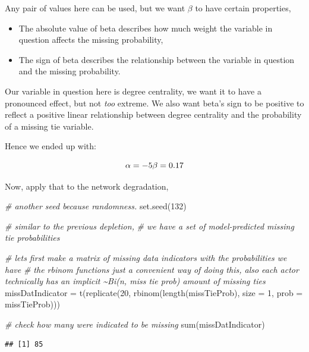 \documentclass[
]{article}
\newenvironment{Shaded}{\begin{snugshade}}{\end{snugshade}}
\newcommand{\AttributeTok}[1]{\textcolor[rgb]{0.77,0.63,0.00}{#1}}
\newcommand{\CommentTok}[1]{\textcolor[rgb]{0.56,0.35,0.01}{\textit{#1}}}
\newcommand{\DecValTok}[1]{\textcolor[rgb]{0.00,0.00,0.81}{#1}}
\newcommand{\FunctionTok}[1]{\textcolor[rgb]{0.00,0.00,0.00}{#1}}
\newcommand{\NormalTok}[1]{#1}
\newcommand{\OtherTok}[1]{\textcolor[rgb]{0.56,0.35,0.01}{#1}}
\providecommand{\tightlist}{%
  \setlength{\itemsep}{0pt}\setlength{\parskip}{0pt}}
\begin{document}
Any pair of values here can be used, but we want \(\beta\) to have
certain properties,

\begin{itemize}
\tightlist
\item
  The absolute value of beta describes how much weight the variable in
  question affects the missing probability,\\
\item
  The sign of beta describes the relationship between the variable in
  question and the missing probability.
\end{itemize}

Our variable in question here is degree centrality, we want it to have a
pronounced effect, but not \emph{too} extreme. We also want beta's sign
to be positive to reflect a positive linear relationship between degree
centrality and the probability of a missing tie variable.

Hence we ended up with:

\[\alpha = -5 \\ \beta = 0.17\]

Now, apply that to the network degradation,

\begin{Shaded}
\begin{Highlighting}[]
\CommentTok{\# another seed because randomness.}
\FunctionTok{set.seed}\NormalTok{(}\DecValTok{132}\NormalTok{)}

\CommentTok{\# similar to the previous depletion,}
\CommentTok{\# we have a set of model{-}predicted missing tie probabilities}

\CommentTok{\# let\textquotesingle{}s first make a matrix of missing data indicators with the probabilities we have}
\CommentTok{\# the rbinom function\textquotesingle{}s just a convenient way of doing this, also each actor technically has an implicit \textasciitilde{}Bi(n, miss tie prob) amount of missing ties}
\NormalTok{missDatIndicator }\OtherTok{=} \FunctionTok{t}\NormalTok{(}\FunctionTok{replicate}\NormalTok{(}\DecValTok{20}\NormalTok{, }\FunctionTok{rbinom}\NormalTok{(}\FunctionTok{length}\NormalTok{(missTieProb), }\AttributeTok{size =} \DecValTok{1}\NormalTok{, }\AttributeTok{prob =}\NormalTok{ missTieProb)))}

\CommentTok{\# check how many were indicated to be missing}
\FunctionTok{sum}\NormalTok{(missDatIndicator)}
\end{Highlighting}
\end{Shaded}

\begin{verbatim}
## [1] 85
\end{verbatim}
\end{document}
